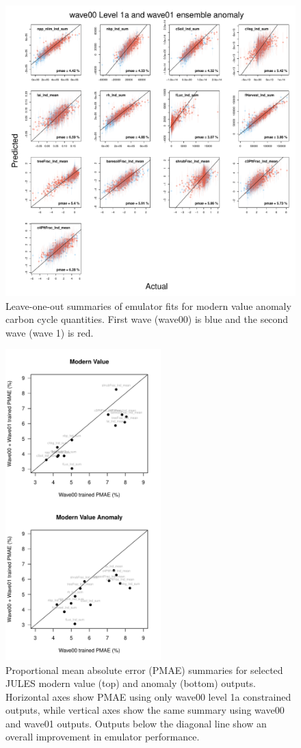 \documentclass[gmd, manuscript]{copernicus}
\begin{document}
%
\begin{figure}[ht]
\includegraphics[width=12cm]{./figs/figA02.pdf}
\caption{Leave-one-out summaries of emulator fits for modern value anomaly carbon cycle quantities. First wave (wave00) is blue and the second wave (wave 1) is red. }
\label{fig:kmloostats_YAnom_wave00_level1a_wave01}
\end{figure}

%
\begin{figure}[ht]
\includegraphics[width=6cm]{./figs/figA03.pdf}
\caption{Proportional mean absolute error (PMAE) summaries for selected JULES modern value (top) and anomaly (bottom) outputs. Horizontal axes show PMAE using only wave00 level 1a constrained outputs, while vertical axes show the same summary using wave00 and wave01 outputs. Outputs below the diagonal line show an overall improvement in emulator performance. }
\label{fig:PMAE_comparison}
\end{figure}
\end{document}
